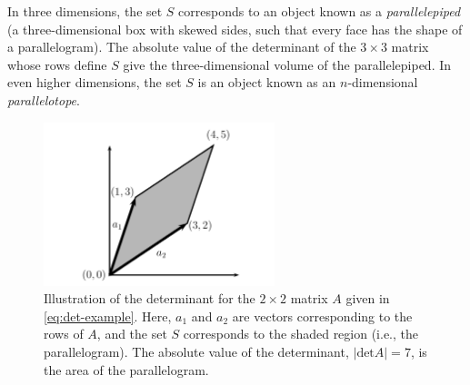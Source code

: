 \documentclass[12pt]{article}
\begin{document}
In three dimensions, the set $S$ corresponds to an object known as a \emph{parallelepiped} (a three-dimensional box with skewed sides, such that
every face has the shape of a parallelogram).  The absolute value of the determinant of the $3 \times 3$ matrix whose rows define $S$ give
the three-dimensional volume of the parallelepiped.  In even higher dimensions, the set $S$ is an object known as an $n$-dimensional \emph{parallelotope}.
%


\begin{figure}[t]
  \begin{center}
\includegraphics[width=0.6\textwidth]{figures/figure}
  \caption{
    Illustration of the determinant for the $2 \times 2$ matrix $A$ given in \eqref{eq:det-example}.  Here, $a_1$ and $a_2$ are vectors
    corresponding to the rows of $A$, and the set $S$ corresponds to the shaded region (i.e., the parallelogram).  The
    absolute value of the determinant, $|\textrm{det} A| = 7$, is the area of the parallelogram. 
  }
  \end{center}
  \label{fig:determinant}
\end{figure}
\end{document}
